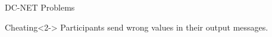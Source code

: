 \begin{frame}{DC-NET Problems}
    
    \begin{alertblock}{Cheating}<2->
        Participants send wrong values in their output messages.
    \end{alertblock}
    
\end{frame}